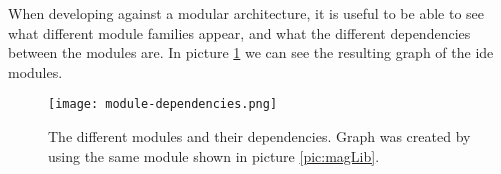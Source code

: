 When developing against a modular architecture, it is useful to be able to see
what different module families appear, and what the different dependencies
between the modules are. In picture \ref{pic:modDep} we can see the resulting
graph of the \gls*{ide} modules.

\begin{figure}[H]
  \centering
  \texttt{[image: module-dependencies.png]}
  \caption{
    The different modules and their dependencies. Graph was created by using the
    same module shown in picture \ref{pic:magLib}.
  }
  \label{pic:modDep}
\end{figure}

